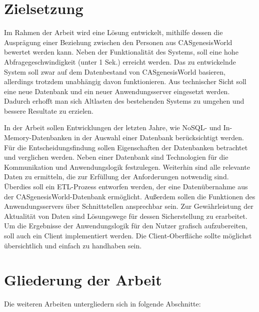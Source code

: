 \section{Zielsetzung}
\label{ch:Einfuehrung:sec:Zielsetzung}

Im Rahmen der Arbeit wird eine Lösung entwickelt, mithilfe dessen die Ausprägung einer Beziehung zwischen den Personen aus CASgenesisWorld bewertet werden kann. Neben der Funktionalität des Systems, soll eine hohe Abfragegeschwindigkeit (unter 1 Sek.) erreicht werden. Das zu entwickelnde System soll zwar auf dem Datenbestand von CASgenesisWorld basieren, allerdings trotzdem unabhängig davon funktionieren. Aus technischer Sicht soll eine neue Datenbank und ein neuer Anwendungsserver eingesetzt werden. Dadurch erhofft man sich Altlasten des bestehenden Systems zu umgehen und bessere Resultate zu erzielen. 

In der Arbeit sollen Entwicklungen der letzten Jahre, wie NoSQL- und In-Memory-Datenbanken in der Auswahl einer Datenbank berücksichtigt werden. Für die Entscheidungsfindung sollen Eigenschaften der Datenbanken betrachtet und verglichen werden. Neben einer Datenbank sind Technologien für die Kommunikation und Anwendungslogik festzulegen. Weiterhin sind alle relevante Daten zu ermitteln, die zur Erfüllung der Anforderungen notwendig sind. Überdies soll ein ETL-Prozess entworfen werden, der eine Datenübernahme aus der CASgenesisWorld-Datenbank ermöglicht. Außerdem sollen die Funktionen des Anwendungsservers über Schnittstellen ansprechbar sein. Zur Gewährleistung der Aktualität von Daten sind Lösungswege für dessen Sicherstellung zu erarbeitet. Um die Ergebnisse der Anwendungslogik für den Nutzer grafisch aufzubereiten, soll auch ein Client implementiert werden. Die Client-Oberfläche sollte möglichst übersichtlich und einfach zu handhaben sein.

\section{Gliederung der Arbeit}
\label{ch:Einfuehrung:sec:Gliederung}

Die weiteren Arbeiten untergliedern sich in folgende Abschnitte: 
 
